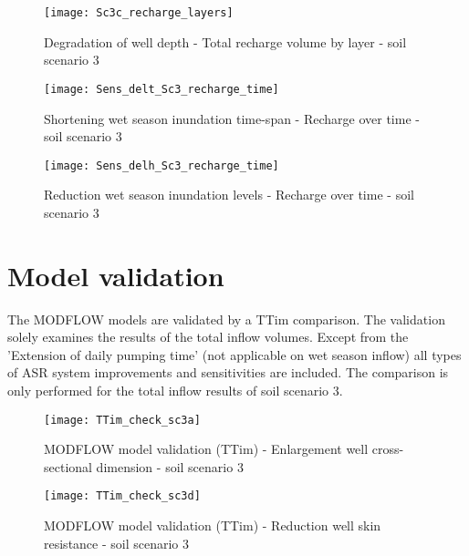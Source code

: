\begin{figure}[h!]
 \centering
 \texttt{[image: Sc3c\_recharge\_layers]}
 \captionsetup{justification=centering} 
 \caption{Degradation of well depth - Total recharge volume by layer - soil scenario 3}
 \label{fig:Sc3c_recharge_layers}
\end{figure}


\begin{figure}[h!]
 \centering
 \texttt{[image: Sens\_delt\_Sc3\_recharge\_time]}
 \captionsetup{justification=centering} 
 \caption{Shortening wet season inundation time-span - Recharge over time - soil scenario 3}
 \label{fig:Sens_delt_Sc3_recharge_time}
\end{figure}

\begin{figure}[h!]
 \centering
 \texttt{[image: Sens\_delh\_Sc3\_recharge\_time]}
 \captionsetup{justification=centering} 
 \caption{Reduction wet season inundation levels - Recharge over time - soil scenario 3}
 \label{fig:Sens_delh_Sc3_recharge_time}
\end{figure}

\newpage
\section{Model validation }
\label{section:mod_val}
The MODFLOW models are validated by a TTim comparison. The validation solely examines the results of the total inflow volumes. Except from the 'Extension of daily pumping time' (not applicable on wet season inflow) all types of ASR system improvements and sensitivities are included. The comparison is only performed for the total inflow results of soil scenario 3. 

\begin{figure}[h!]
 \centering
 \texttt{[image: TTim\_check\_sc3a]}
 \captionsetup{justification=centering} 
 \caption{MODFLOW model validation (TTim) - Enlargement well cross-sectional dimension - soil scenario 3}
 \label{fig:TTim_check_sc3a}
\end{figure}

\begin{figure}[h!]
 \centering
 \texttt{[image: TTim\_check\_sc3d]}
 \captionsetup{justification=centering} 
 \caption{MODFLOW model validation (TTim) - Reduction well skin resistance - soil scenario 3}
 \label{fig:TTim_check_sc3d}
\end{figure}


